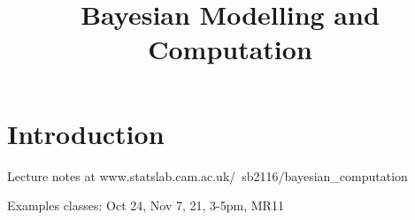 \documentclass[a4paper]{article}
\begin{document}
\title{Bayesian Modelling and Computation}

\maketitle

\newpage

\tableofcontents

\newpage

\section{Introduction}

Lecture notes at www.statslab.cam.ac.uk/~sb2116/bayesian\_computation

Examples classes: Oct 24, Nov 7, 21, 3-5pm, MR11
\end{document}
